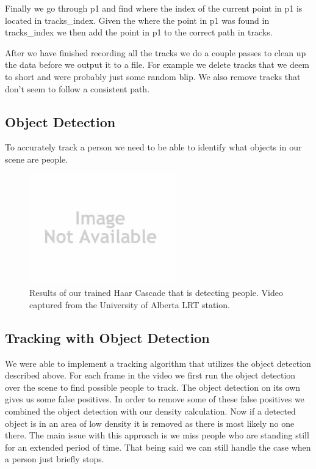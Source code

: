\documentclass[12pt, twocolumn, conference]{IEEEtran}
\begin{document}
Finally we go through p1 and find where the index of the current point in p1 is located in tracks\_index. Given the where the point in p1 was found in tracks\_index we then add the point in p1 to the correct path in tracks.

After we have finished recording all the tracks we do a couple passes to clean up the data before we output it to a file. For example we delete tracks that we deem to short and were probably just some random blip. We also remove tracks that don’t seem to follow a consistent path.

\subsection{Object Detection}

To accurately track a person we need to be able to identify what objects in our scene are people.

\begin{figure}[!t]
\centering
\includegraphics[width=2.5in]{noImage.jpg}
\caption{Results of our trained Haar Cascade that is detecting people. Video captured from the University of Alberta LRT station.}
\label{Object_Detection}
\end{figure}

\subsection{Tracking with Object Detection}

We were able to implement a tracking algorithm that utilizes the object detection described above. For each frame in the video we first run the object detection over the scene to find possible people to track. The object detection on its own gives us some false positives. In order to remove some of these false positives we combined the object detection with our density calculation. Now if a detected object is in an area of low density it is removed as there is most likely no one there. The main issue with this approach is we miss people who are standing still for an extended period of time. That being said we can still handle the case when a person just briefly stops.
\end{document}
